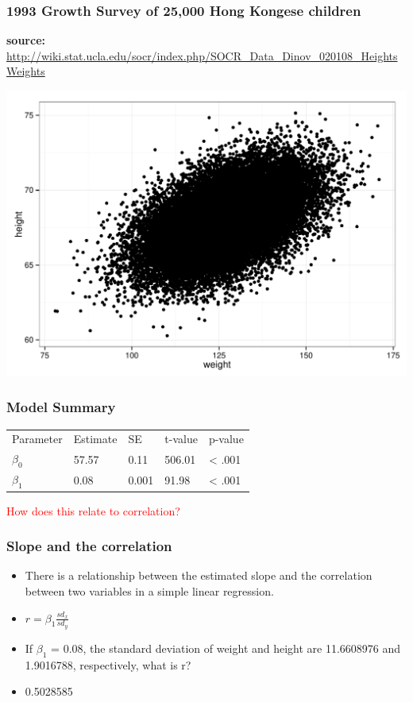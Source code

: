 \documentclass[dvipsnames]{beamer}\usepackage[]{graphicx}\usepackage[]{color}
\makeatletter
\def\maxwidth{ %
  \ifdim\Gin@nat@width>\linewidth
    \linewidth
  \else
    \Gin@nat@width
  \fi
}
\newenvironment{knitrout}{}{} %
\makeatother
\begin{document}
\begin{frame}
\frametitle{1993 Growth Survey of 25,000 Hong Kongese children}
\footnotesize \textbf{source:} \url{http://wiki.stat.ucla.edu/socr/index.php/SOCR_Data_Dinov_020108_HeightsWeights}
\begin{knitrout}
\color{fgcolor}

{\centering \includegraphics[width=\maxwidth]{figure/unnamed-chunk-15-1} 

}



\end{knitrout}
\end{frame}

\begin{frame}[fragile]
\frametitle{Model Summary}
\begin{tabular}{lllll}
\hline
Parameter & Estimate & SE & t-value & p-value \\
$\beta_0$ & 57.57  & 0.11 & 506.01 & < .001 \\
$\beta_1$ & 0.08 & 0.001 & 91.98 & < .001 \\
\hline
\end{tabular}

\vspace{.5cm}
\textcolor{red}{How does this relate to correlation?}
\end{frame}

\begin{frame}
\frametitle{Slope and the correlation}
\begin{itemize}
\item<1-> There is a relationship between the estimated slope and the correlation between two variables in a simple linear regression.
\item<2-> $r = \beta_1 \frac{sd_x}{sd_y}$ 
\item<3-> If $\beta_1$ = 0.08, the standard deviation of weight and height are 11.6608976 and 1.9016788, respectively, what is r?
\item<4-> 0.5028585
\end{itemize}

\end{frame}
\end{document}
